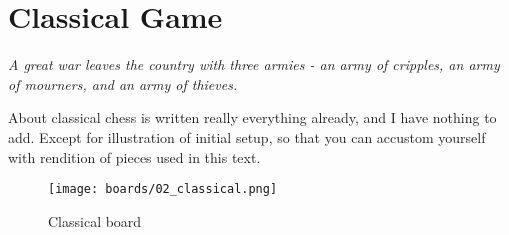 
\chapter*{Classical Game}

\begin{flushright}
\parbox{0.8\textwidth}{
\emph{A great war leaves the country with three armies -
an army of cripples, an army of mourners, and an army of thieves. \\
 } }
\end{flushright}

\noindent
About classical chess is written really everything already, and I
have nothing to add. Except for illustration of initial setup, so that
you can accustom yourself with rendition of pieces used in this text.

\noindent
\begin{figure}[t]
\texttt{[image: boards/02\_classical.png]}
\caption{Classical board}
\label{fig:02_classical}
\end{figure}

\clearpage %
